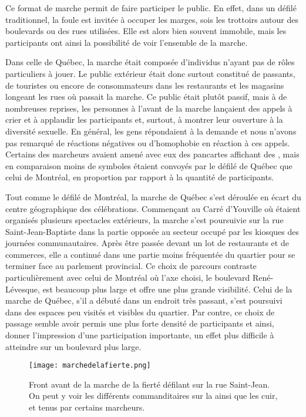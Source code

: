 Ce format de marche permit de faire participer le public.
En effet, dans un défilé traditionnel, la foule est invitée à occuper les marges, sois les trottoirs autour des boulevards ou des rues utilisées.
Elle est alors bien souvent immobile, mais les participants ont ainsi la possibilité de voir l'ensemble de la marche.

Dans celle de Québec, la marche était composée d'individus n'ayant pas de rôles particuliers à jouer.
Le public extérieur était donc surtout constitué de passants, de touristes ou encore de consommateurs dans les restaurants et les magasins longeant les rues où passait la marche.
Ce public était plutôt passif, mais à de nombreuses reprises, les personnes à l'avant de la marche lançaient des appels à crier et à applaudir les participants et, surtout, à montrer leur ouverture à la diversité sexuelle.
En général, les gens répondaient à la demande et nous n'avons pas remarqué de réactions négatives ou d'homophobie en réaction à ces appels.
Certains des marcheurs avaient amené avec eux des pancartes affichant des , mais en comparaison moins de symboles étaient convoyés par le défilé de Québec que celui de Montréal, en proportion par rapport à la quantité de participants.

Tout comme le défilé de Montréal, la marche de Québec s'est déroulée en écart du centre géographique des célébrations.
Commençant au Carré d'Youville où étaient organisés plusieurs spectacles extérieurs, la marche s'est poursuivie sur la rue Saint-Jean-Baptiste dans la partie opposée au secteur occupé par les kiosques des journées communautaires.
Après être passée devant un lot de restaurants et de commerces, elle a continué dans une partie moins fréquentée du quartier pour se terminer face au parlement provincial.
Ce choix de parcours contraste particulièrement avec celui de Montréal où l'axe choisi, le boulevard René-Lévesque, est beaucoup plus large et offre une plus grande visibilité.
Celui de la marche de Québec, s'il a débuté dans un endroit très passant, s'est poursuivi dans des espaces peu visités et visibles du quartier.
Par contre, ce choix de passage semble avoir permis une plus forte densité de participants et ainsi, donner l'impression d'une participation importante, un effet plus difficile à atteindre sur un boulevard plus large.

\begin{figure}[ht]
  \centering
  \texttt{[image: marchedelafierte.png]}\caption[Marche de la fierté]{Front avant de la marche de la fierté défilant sur la rue Saint-Jean. On peut y voir les différents commanditaires sur la  ainsi que les  cuir,  et  tenus par certains marcheurs.\label{fig:marchedelafierte}}
\end{figure}

